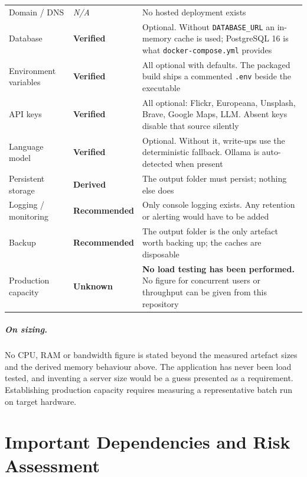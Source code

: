 \documentclass[11pt,a4paper]{report}
\newcommand{\code}[1]{\texttt{\small #1}}
\DeclareRobustCommand{\file}[1]{{\small\nolinkurl{#1}}}
\newcommand{\na}{\textcolor{cNote}{\textit{N/A}}}
\newcommand{\lblV}{\textcolor{cBack}{\textbf{Verified}}}
\newcommand{\lblD}{\textcolor{cFront}{\textbf{Derived}}}
\newcommand{\lblR}{\textcolor{cInfra}{\textbf{Recommended}}}
\newcommand{\lblU}{\textcolor{cNote}{\textbf{Unknown}}}
\begin{document}
\begin{longtable}{@{}>{\raggedright\arraybackslash}p{3.1cm}>{\raggedright\arraybackslash}p{2.6cm}>{\raggedright\arraybackslash}p{9.0cm}@{}}
Domain / DNS                & \na   & No hosted deployment exists\\
Database                    & \lblV & Optional. Without \code{DATABASE\_URL} an in-memory cache is used; PostgreSQL 16 is what \file{docker-compose.yml} provides\\
Environment variables       & \lblV & All optional with defaults. The packaged build ships a commented \file{.env} beside the executable\\
API keys                    & \lblV & All optional: Flickr, Europeana, Unsplash, Brave, Google Maps, LLM. Absent keys disable that source silently\\
Language model              & \lblV & Optional. Without it, write-ups use the deterministic fallback. Ollama is auto-detected when present\\
Persistent storage          & \lblD & The output folder must persist; nothing else does\\
Logging / monitoring        & \lblR & Only console logging exists. Any retention or alerting would have to be added\\
Backup                      & \lblR & The output folder is the only artefact worth backing up; the caches are disposable\\
Production capacity         & \lblU & \textbf{No load testing has been performed.} No figure for concurrent users or throughput can be given from this repository\\
\end{longtable}

\paragraph{On sizing.} No CPU, RAM or bandwidth figure is stated beyond the
measured artefact sizes and the derived memory behaviour above. The application
has never been load tested, and inventing a server size would be a guess
presented as a requirement. Establishing production capacity requires measuring a
representative batch run on target hardware.

\chapter{Important Dependencies and Risk Assessment}
\label{sec:risk}
\end{document}
